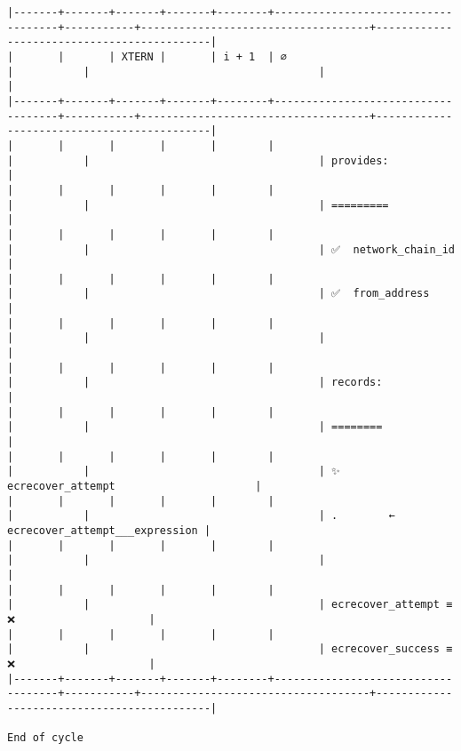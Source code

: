 \documentclass[varwidth=\maxdimen,margin=0.5cm,multi={verbatim}]{standalone}
\begin{document}
\begin{verbatim}
|-------+-------+-------+-------+--------+------------------------------------+-----------+------------------------------------+--------------------------------------------|
|       |       | XTERN |       | i + 1  | ∅                                  |           |                                    |                                            |
|-------+-------+-------+-------+--------+------------------------------------+-----------+------------------------------------+--------------------------------------------|
|       |       |       |       |        |                                    |           |                                    | provides:                                  |
|       |       |       |       |        |                                    |           |                                    | =========                                  |
|       |       |       |       |        |                                    |           |                                    | ✅  network_chain_id                       |
|       |       |       |       |        |                                    |           |                                    | ✅  from_address                           |
|       |       |       |       |        |                                    |           |                                    |                                            |
|       |       |       |       |        |                                    |           |                                    | records:                                   |
|       |       |       |       |        |                                    |           |                                    | ========                                   |
|       |       |       |       |        |                                    |           |                                    | ✨  ecrecover_attempt                      |
|       |       |       |       |        |                                    |           |                                    | .        ←  ecrecover_attempt___expression |
|       |       |       |       |        |                                    |           |                                    |                                            |
|       |       |       |       |        |                                    |           |                                    | ecrecover_attempt ≡ ❌                     |
|       |       |       |       |        |                                    |           |                                    | ecrecover_success ≡ ❌                     |
|-------+-------+-------+-------+--------+------------------------------------+-----------+------------------------------------+--------------------------------------------|

End of cycle

\end{verbatim}
\end{document}
